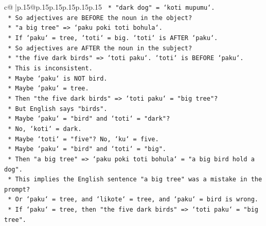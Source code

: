 \documentclass{article}
\begin{document}
{\begin{supertabular}{c@{$\;$}|p{.15\linewidth}@{}p{.15\linewidth}p{.15\linewidth}p{.15\linewidth}p{.15\linewidth}p{.15\linewidth}}
{{{\texttt{                                        *   "dark dog" = `koti mupumu`.} \\
\texttt{                                        *   So adjectives are BEFORE the noun in the object?} \\
\texttt{                                        *   "a big tree" => `paku poki toti bohula`.} \\
\texttt{                                        *   If `paku` = tree, `toti` = big. `toti` is AFTER `paku`.} \\
\texttt{                                        *   So adjectives are AFTER the noun in the subject?} \\
\texttt{                                        *   "the five dark birds" => `toti paku`. `toti` is BEFORE `paku`.} \\
\texttt{                                        *   This is inconsistent.} \\
\texttt{                                        *   Maybe `paku` is NOT bird.} \\
\texttt{                                        *   Maybe `paku` = tree.} \\
\texttt{                                        *   Then "the five dark birds" => `toti paku` = "big tree"?} \\
\texttt{                                        *   But English says "birds".} \\
\texttt{                                        *   Maybe `paku` = "bird" and `toti` = "dark"?} \\
\texttt{                                        *   No, `koti` = dark.} \\
\texttt{                                        *   Maybe `toti` = "five"? No, `ku` = five.} \\
\texttt{                                        *   Maybe `paku` = "bird" and `toti` = "big".} \\
\texttt{                                        *   Then "a big tree" => `paku poki toti bohula` = "a big bird hold a dog".} \\
\texttt{                                        *   This implies the English sentence "a big tree" was a mistake in the prompt?} \\
\texttt{                                        *   Or `paku` = tree, and `likote` = tree, and `paku` = bird is wrong.} \\
\texttt{                                        *   If `paku` = tree, then "the five dark birds" => `toti paku` = "big tree".} \\
}}}
\end{supertabular}}
\end{document}
